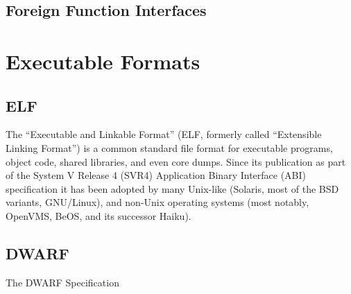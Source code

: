 \subsection{Foreign Function Interfaces}


%

\section{Executable Formats}

\subsection{ELF}

The “Executable and Linkable Format” (ELF, formerly called “Extensible Linking
Format”) is a common standard file format for executable programs, object
code, shared libraries, and even core dumps. Since its publication as part of
the System V Release 4 (SVR4) Application Binary Interface (ABI) specification
\cite[c.~4]{elfspec-sysv}
it has been adopted by many Unix-like (Solaris, most of the BSD variants,
GNU/Linux), and non-Unix operating systems (most notably, OpenVMS, BeOS, and
its successor Haiku).

\subsection{DWARF}

The DWARF Specification \cite{dwarfspecv4}


